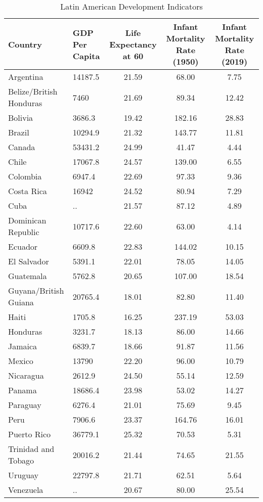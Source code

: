 \documentclass[
]{article}
\begin{document}
\begin{landscape} 


\begin{table}[ht]
\centering
\caption{Latin American Development Indicators} 
\begin{tabular}{l|p{2.5cm}ccc}
Country & GDP Per Capita & Life Expectancy at 60 & Infant Mortality Rate (1950) & Infant Mortality Rate (2019) \\ 
  \hline
Argentina & 14187.5 & 21.59 & 68.00 & 7.75 \\ 
  Belize/British Honduras & 7460 & 21.69 & 89.34 & 12.42 \\ 
  Bolivia & 3686.3 & 19.42 & 182.16 & 28.83 \\ 
  Brazil & 10294.9 & 21.32 & 143.77 & 11.81 \\ 
  Canada & 53431.2 & 24.99 & 41.47 & 4.44 \\ 
  Chile & 17067.8 & 24.57 & 139.00 & 6.55 \\ 
  Colombia & 6947.4 & 22.69 & 97.33 & 9.36 \\ 
  Costa Rica & 16942 & 24.52 & 80.94 & 7.29 \\ 
  Cuba & .. & 21.57 & 87.12 & 4.89 \\ 
  Dominican Republic & 10717.6 & 22.60 & 63.00 & 4.14 \\ 
  Ecuador & 6609.8 & 22.83 & 144.02 & 10.15 \\ 
  El Salvador & 5391.1 & 22.01 & 78.05 & 14.05 \\ 
  Guatemala & 5762.8 & 20.65 & 107.00 & 18.54 \\ 
  Guyana/British Guiana & 20765.4 & 18.01 & 82.80 & 11.40 \\ 
  Haiti & 1705.8 & 16.25 & 237.19 & 53.03 \\ 
  Honduras & 3231.7 & 18.13 & 86.00 & 14.66 \\ 
  Jamaica & 6839.7 & 18.66 & 91.87 & 11.56 \\ 
  Mexico & 13790 & 22.20 & 96.00 & 10.79 \\ 
  Nicaragua & 2612.9 & 24.50 & 55.14 & 12.59 \\ 
  Panama & 18686.4 & 23.98 & 53.02 & 14.27 \\ 
  Paraguay & 6276.4 & 21.01 & 75.69 & 9.45 \\ 
  Peru & 7906.6 & 23.37 & 164.76 & 16.01 \\ 
  Puerto Rico & 36779.1 & 25.32 & 70.53 & 5.31 \\ 
  Trinidad and Tobago & 20016.2 & 21.44 & 74.65 & 21.55 \\ 
  Uruguay & 22797.8 & 21.71 & 62.51 & 5.64 \\ 
  Venezuela & .. & 20.67 & 80.00 & 25.54 \\ 
\end{tabular}
\end{table}


\end{landscape}
\end{document}

